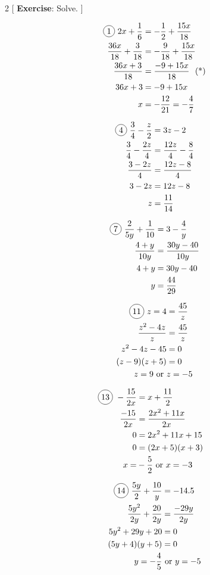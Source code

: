 \begin{multicols}{2}
[
  \textbf{Exercise}: Solve.
]

\begin{align*}
  \circled{1}\ 2x+\frac{1}{6}&=-\frac{1}{2}+\frac{15x}{18}\\
  \frac{36x}{18}+\frac{3}{18}&=-\frac{9}{18}+\frac{15x}{18}\\
  \frac{36x+3}{18}&=\frac{-9+15x}{18}\ \text{ (*)}\\
  36x+3&=-9+15x\\
  x&=-\frac{12}{21}=-\frac{4}{7}
\end{align*}

\begin{align*}
  \circled{4}\ \frac{3}{4}-\frac{z}{2}&=3z-2\\
  \frac{3}{4}-\frac{2z}{4}&=\frac{12z}{4}-\frac{8}{4}\\
  \frac{3-2z}{4}&=\frac{12z-8}{4}\\
  3-2z&=12z-8\\
  z&=\frac{11}{14}
\end{align*}

\begin{align*}
  \circled{7}\ \frac{2}{5y}+\frac{1}{10}&=3-\frac{4}{y}\\
  \frac{4+y}{10y}&=\frac{30y-40}{10y}\\
  4+y&=30y-40\\
  y&=\frac{44}{29}
\end{align*}

\begin{align*}
  \circled{11}\ z=4&=\frac{45}{z}\\
  \frac{z^{2}-4z}{z}&=\frac{45}{z}\\
  z^{2}-4z-45&=0\\
  (z-9)(z+5)&=0\\
  z=9 \text{ or }&z=-5
\end{align*}

\begin{align*}
  \circled{13}\ -\frac{15}{2x}&=x+\frac{11}{2}\\
  \frac{-15}{2x}&=\frac{2x^{2}+11x}{2x}\\
  0&=2x^{2}+11x+15&\\
  0&=(2x+5)(x+3)\\
  x=&-\frac{5}{2} \text{ or }x=-3
\end{align*}

\begin{align*}
  \circled{14}\ \frac{5y}{2}+\frac{10}{y}&=-14.5\\
  \frac{5y^{2}}{2y}+\frac{20}{2y}&=\frac{-29y}{2y}\\
  5y^{2}+29y+20&=0\\
  (5y+4)(y+5)&=0\\
  y=-\frac{4}{5} &\text{ or }y=-5
\end{align*}
\end{multicols}

